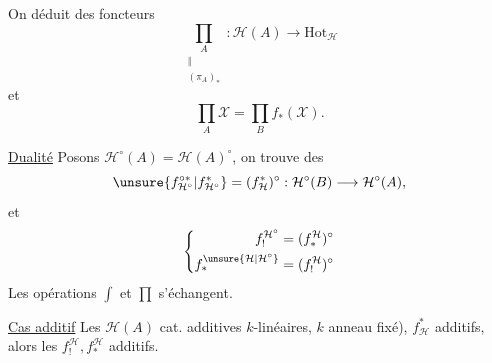 On déduit des foncteurs
\[
\underset{\substack{\Vert\\(\pi_A)_*}}{\prod_A}:\mathcal H(A)\longrightarrow\mathrm{Hot}_{\mathcal H}
\]
et
\[
\prod_A\mathcal X=\prod_B f_*(\mathcal X).
\]

\uline{Dualité} Posons $\mathcal H^{\circ}(A)=\mathcal H(A)^{\circ}$, on trouve
des
\[
\unsure{f_{\mathcal H^{\circ}}^{\circ *}|f_{\mathcal H^{\circ}}^{*}}
=(f_{\mathcal H}^{*})^{\circ}:\mathcal H^{\circ}(B)\longrightarrow\mathcal H^{\circ}(A),
\]
et
\[
\left\{\begin{aligned}
f_!^{\mathcal H^{\circ}}&=(f_*^{\mathcal H})^{\circ}\\
f_*^{\unsure{\mathcal H|\mathcal H^{\circ}}}&=(f_!^{\mathcal H})^{\circ}
\end{aligned}\right.
\]
Les opérations $\int$ et $\prod$ s'échangent.

\uline{Cas additif} Les $\mathcal H(A)$  cat. additives
 $k$-linéaires, $k$ anneau fixé), $f_{\mathcal H}^{*}$
additifs, alors les $f_!^{\mathcal H},f_*^{\mathcal H}$ additifs.

